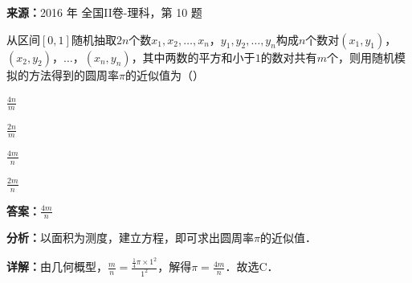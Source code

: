 \begin{question}[points=5]
\textbf{来源：}2016 年 全国II卷-理科，第 10 题\par
从区间$[0,1]$随机抽取$2n$个数$x_1,x_2,\ldots,x_n$，$y_1,y_2,\ldots,y_n$构成$n$个数对$(x_1,y_1)$，$(x_2,y_2)$，$\ldots$，$(x_n,y_n)$，其中两数的平方和小于$1$的数对共有$m$个，则用随机模拟的方法得到的圆周率$\pi$的近似值为（\quad）
\begin{choices}
  \item $\frac{4n}{m}$
  \item $\frac{2n}{m}$
  \item $\frac{4m}{n}$
  \item $\frac{2m}{n}$
\end{choices}
\begin{solution}
\textbf{答案：}$\frac{4m}{n}$

\textbf{分析：}以面积为测度，建立方程，即可求出圆周率$\pi$的近似值．

\textbf{详解：}由几何概型，$\frac{m}{n}=\frac{\frac{1}{4}\pi\times1^2}{1^2}$，解得$\pi=\frac{4m}{n}$．故选C．
\end{solution}
\end{question}

